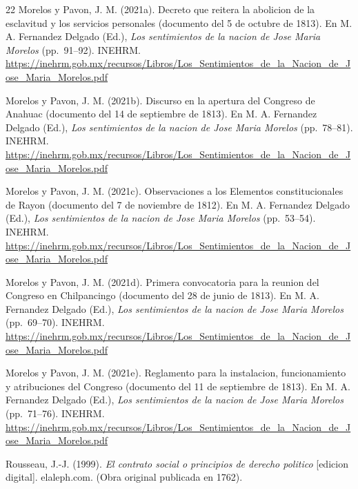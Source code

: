 \documentclass[spanish,letterpaper,oneside]{article}
\begin{document}
\begin{thebibliography}{22}
Morelos y Pavon, J. M. (2021a). Decreto que reitera la abolicion de la
esclavitud y los servicios personales (documento del 5 de octubre de
1813). En M. A. Fernandez Delgado (Ed.), \emph{Los sentimientos de la
nacion de Jose Maria Morelos} (pp.~91--92). INEHRM.
\url{https://inehrm.gob.mx/recursos/Libros/Los_Sentimientos_de_la_Nacion_de_Jose_Maria_Morelos.pdf}

Morelos y Pavon, J. M. (2021b). Discurso en la apertura del Congreso de
Anahuac (documento del 14 de septiembre de 1813). En M. A. Fernandez
Delgado (Ed.), \emph{Los sentimientos de la nacion de Jose Maria
Morelos} (pp.~78--81). INEHRM.
\url{https://inehrm.gob.mx/recursos/Libros/Los_Sentimientos_de_la_Nacion_de_Jose_Maria_Morelos.pdf}

Morelos y Pavon, J. M. (2021c). Observaciones a los Elementos
constitucionales de Rayon (documento del 7 de noviembre de 1812).
En M. A. Fernandez Delgado (Ed.), \emph{Los sentimientos de la nacion
de Jose Maria Morelos} (pp.~53--54). INEHRM.
\url{https://inehrm.gob.mx/recursos/Libros/Los_Sentimientos_de_la_Nacion_de_Jose_Maria_Morelos.pdf}

Morelos y Pavon, J. M. (2021d). Primera convocatoria para la reunion del
Congreso en Chilpancingo (documento del 28 de junio de 1813). En M. A.
Fernandez Delgado (Ed.), \emph{Los sentimientos de la nacion de Jose
Maria Morelos} (pp.~69--70). INEHRM.
\url{https://inehrm.gob.mx/recursos/Libros/Los_Sentimientos_de_la_Nacion_de_Jose_Maria_Morelos.pdf}

Morelos y Pavon, J. M. (2021e). Reglamento para la instalacion,
funcionamiento y atribuciones del Congreso (documento del 11 de
septiembre de 1813). En M. A. Fernandez Delgado (Ed.), \emph{Los
sentimientos de la nacion de Jose Maria Morelos} (pp.~71--76). INEHRM.
\url{https://inehrm.gob.mx/recursos/Libros/Los_Sentimientos_de_la_Nacion_de_Jose_Maria_Morelos.pdf}

\enlargethispage{\baselineskip}
Rousseau, J.-J. (1999). \emph{El contrato social o principios de derecho
politico} [edicion digital]. elaleph.com. (Obra original publicada en 1762).
\end{thebibliography}
\end{document}

